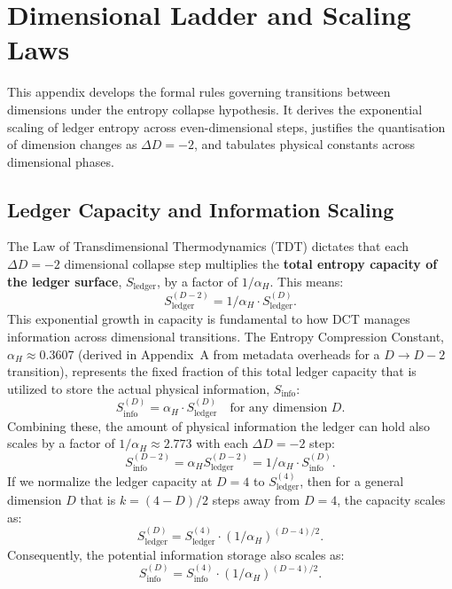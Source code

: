 \documentclass[a4paper, 12pt, oneside]{book}
\numberwithin{equation}{chapter}
\begin{document}


\chapter{Dimensional Ladder and Scaling Laws}
\label{app:DimensionalLadder}

\noindent
This appendix develops the formal rules governing transitions between dimensions under the entropy collapse hypothesis.  
It derives the exponential scaling of ledger entropy across even-dimensional steps, justifies the quantisation of dimension changes as \( \Delta D = -2 \), and tabulates physical constants across dimensional phases.

\section{Ledger Capacity and Information Scaling}
\label{sec:ExponentialGrowth} 

The Law of Transdimensional Thermodynamics (TDT) dictates that each $\Delta D = -2$ dimensional collapse step multiplies the \textbf{total entropy capacity of the ledger surface}, $S_{\text{ledger}}$, by a factor of $1/\alpha_H$. This means:
\[
    S_{\text{ledger}}^{(D-2)} = 1/\alpha_H \cdot S_{\text{ledger}}^{(D)}.
\]
This exponential growth in capacity is fundamental to how DCT manages information across dimensional transitions.
The Entropy Compression Constant, $\alpha_H \approx 0.3607$ (derived in Appendix~A from metadata overheads for a $D \rightarrow D-2$ transition), represents the fixed fraction of this total ledger capacity that is utilized to store the actual physical information, $S_{\text{info}}$:
\[
    S_{\text{info}}^{(D)} = \alpha_H \cdot S_{\text{ledger}}^{(D)} \quad \text{for any dimension } D.
\]
Combining these, the amount of physical information the ledger can hold also scales by a factor of \(1/\alpha_H\! \approx 2.773\) with each \(\Delta D = -2\) step:
\[
    S_{\text{info}}^{(D-2)} = \alpha_H S_{\text{ledger}}^{(D-2)} = 1/\alpha_H \cdot S_{\text{info}}^{(D)}.
\]
If we normalize the ledger capacity at $D=4$ to $S_{\text{ledger}}^{(4)}$, then for a general dimension $D$ that is $k = (4-D)/2$ steps away from $D=4$, the capacity scales as:
\[
    S_{\text{ledger}}^{(D)} = S_{\text{ledger}}^{(4)} \cdot (1/\alpha_H)^{(D-4)/2}.
\]
Consequently, the potential information storage also scales as:
\[
    S_{\text{info}}^{(D)} = S_{\text{info}}^{(4)} \cdot (1/\alpha_H)^{(D-4)/2}.
\]
\end{document}
